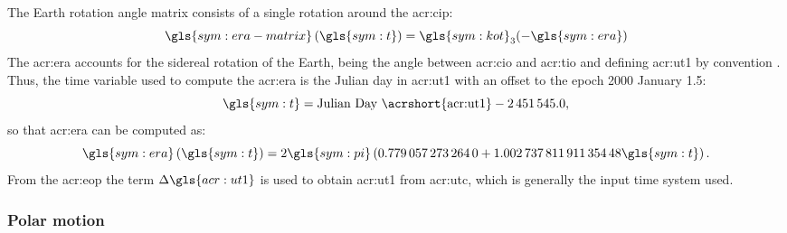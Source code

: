 The Earth rotation angle matrix consists of a single rotation around the \gls{acr:cip}:
\begin{equation}
\gls{sym:era-matrix}\left(\gls{sym:t}\right) = \gls{sym:kot}_{3}(-\gls{sym:era}) 
\label{eq:ERAtrans}
\end{equation}
The \gls{acr:era} accounts for the sidereal rotation of the Earth, being the angle between \gls{acr:cio} and \gls{acr:tio} and defining \gls{acr:ut1} by convention \citep{luzum2010}. Thus, the time variable used to compute 
the \gls{acr:era} is the Julian day in \gls{acr:ut1} with an offset to the epoch 2000 January 1.5:
\begin{equation}
 \gls{sym:t} = \text{Julian Day \acrshort{acr:ut1}} - \num{2451545.0},
\end{equation}
so that \gls{acr:era} can be computed as:
\begin{equation}
 \gls{sym:era}\left(\gls{sym:t}\right) = 2\gls{sym:pi} \left(\num{0.7790572732640} + \num{1.00273781191135448}\gls{sym:t}\right).
\label{eq:ERA}
\end{equation}
From the \gls{acr:eop} the term $\Delta \gls{acr:ut1}$ is used to obtain \gls{acr:ut1} from \gls{acr:utc}, which is generally the input time system used. 

\subsubsection{Polar motion}
\label{sec:polar-motion}

